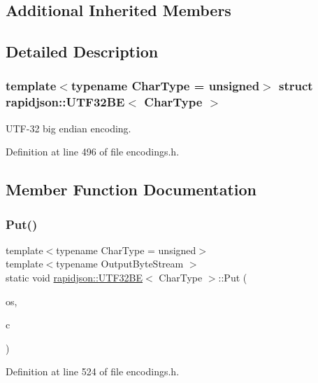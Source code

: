 \subsection*{Additional Inherited Members}


\subsection{Detailed Description}
\subsubsection*{template$<$typename Char\+Type = unsigned$>$\newline
struct rapidjson\+::\+U\+T\+F32\+B\+E$<$ Char\+Type $>$}

U\+T\+F-\/32 big endian encoding. 

Definition at line 496 of file encodings.\+h.



\subsection{Member Function Documentation}
\mbox{\label{structrapidjson_1_1_u_t_f32_b_e_ab9a9ff04ee3e835839fffd99037d4615}} 
\subsubsection{\texorpdfstring{Put()}{Put()}}
{\footnotesize\ttfamily template$<$typename Char\+Type  = unsigned$>$ \\
template$<$typename Output\+Byte\+Stream $>$ \\
static void \mbox{\hyperlink{structrapidjson_1_1_u_t_f32_b_e}{rapidjson\+::\+U\+T\+F32\+BE}}$<$ Char\+Type $>$\+::Put (\begin{DoxyParamCaption}\item[{Output\+Byte\+Stream \&}]{os,  }\item[{Char\+Type}]{c }\end{DoxyParamCaption})\hspace{0.3cm}{\ttfamily [static]}}



Definition at line 524 of file encodings.\+h.


